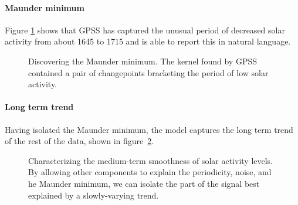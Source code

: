 \documentclass{article}
\begin{document}

\paragraph{Maunder minimum}

Figure \ref{fig:maunder} shows that GPSS has captured the unusual period of decreased solar activity from about 1645 to 1715 and is able to report this in natural language.

\begin{figure}[ht]
\centering
{}
\caption{Discovering the Maunder minimum.  The kernel found by GPSS contained a pair of changepoints bracketing the period of low solar activity.}
\label{fig:maunder}
\end{figure}

\paragraph{Long term trend}

Having isolated the Maunder minimum, the model captures the long term trend of the rest of the data, shown in figure~\ref{fig:smooth}.

\begin{figure}[h!]
\centering
{}
\caption{Characterizing the medium-term smoothness of solar activity levels.  By allowing other components to explain the periodicity, noise, and he Maunder minimum, we can isolate the part of the signal best explained by a slowly-varying trend.}
\label{fig:smooth}
\end{figure}
\end{document}
